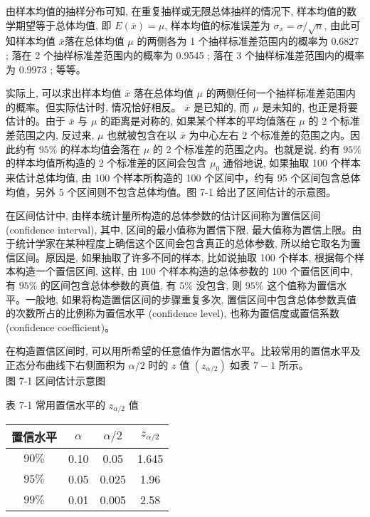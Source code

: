 \documentclass[10pt]{article}
\begin{document}
\begin{CJK*}{UTF8}{bsmi}
由样本均值的抽样分布可知, 在重复抽样或无限总体抽样的情况下, 样本均值的数学期望等于总体均值, 即 $E(\bar{x})=\mu$, 样本均值的标准误差为 $\sigma_{x}=\sigma / \sqrt{n}$, 由此可知样本均值 $\bar{x}$落在总体均值 $\mu$ 的两侧各为 1 个抽样标准差范围内的概率为 0.6827 ; 落在 2 个抽样标准差范围内的概率为 0.9545 ; 落在 3 个抽样标准差范围内的概率为 0.9973 ; 等等。

实际上, 可以求出样本均值 $\bar{x}$ 落在总体均值 $\mu$ 的两侧任何一个抽样标准差范围内的概率。但实际估计时, 情况恰好相反。 $\bar{x}$ 是已知的, 而 $\mu$ 是未知的, 也正是将要估计的。由于 $\bar{x}$ 与 $\mu$ 的距离是对称的, 如果某个样本的平均值落在 $\mu$ 的 2 个标准差范围之内, 反过来, $\mu$ 也就被包含在以 $\bar{x}$ 为中心左右 2 个标准差的范围之内。因此约有 $95 \%$ 的样本均值会落在 $\mu$ 的 2 个标准差的范围之内。也就是说, 约有 $95 \%$ 的样本均值所构造的 2 个标准差的区间会包含 $\mu_{0}$ 通俗地说, 如果抽取 100 个样本来估计总体均值, 由 100 个样本所构造的 100 个区间中，约有 95 个区间包含总体均值，另外 5 个区间则不包含总体均值。图 7-1 给出了区间估计的示意图。

在区间估计中, 由样本统计量所构造的总体参数的估计区间称为置信区间 (confidence interval), 其中, 区间的最小值称为置信下限, 最大值称为置信上限。由于统计学家在某种程度上确信这个区间会包含真正的总体参数, 所以给它取名为置信区间。原因是, 如果抽取了许多不同的样本, 比如说抽取 100 个样本, 根据每个样本构造一个置信区间, 这样, 由 100 个样本构造的总体参数的 100 个置信区间中, 有 $95 \%$ 的区间包含总体参数的真值, 有 $5 \%$ 没包含, 则 $95 \%$ 这个值称为置信水平。一般地, 如果将构造置信区间的步骤重复多次, 置信区间中包含总体参数真值的次数所占的比例称为置信水平 (confidence level), 也称为置信度或置信系数 (confidence coefficient)。

在构造置信区间时, 可以用所希望的任意值作为置信水平。比较常用的置信水平及正态分布曲线下右侧面积为 $\alpha / 2$ 时的 $z$ 值 $\left(z_{\alpha / 2}\right)$ 如表 $7-1$ 所示。\\

图 7-1 区间估计示意图

表 7-1 常用置信水平的 $z_{\alpha / 2}$ 值

\begin{center}
\begin{tabular}{cccc}
\hline
置信水平 & $\alpha$ & $\alpha / 2$ & $z_{\alpha / 2}$ \\
\hline
$90 \%$ & 0.10 & 0.05 & 1.645 \\
$95 \%$ & 0.05 & 0.025 & 1.96 \\
$99 \%$ & 0.01 & 0.005 & 2.58 \\
\hline
\end{tabular}
\end{center}


\end{CJK*}
\end{document}
